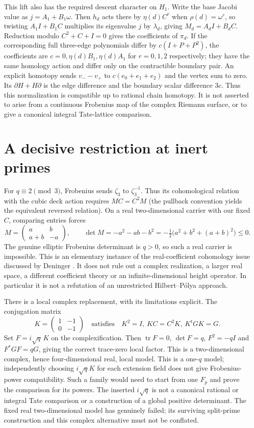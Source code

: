 \documentclass[11pt,oneside,openany]{book}
\theoremstyle{definition}\newtheorem{definition}[theorem]{Definition}
\theoremstyle{remark}\newtheorem{remark}[theorem]{Remark}
\DeclareMathOperator{\tr}{tr}\DeclareMathOperator{\Rea}{Re}
\begin{document}
This lift also has the required descent character on $H_1$. Write the base Jacobi value as $j=A_1+B_1\omega$. Then $h_d$ acts there by $\eta(d)C^r$ when $\rho(d)=\omega^r$, so twisting $A_1I+B_1C$ multiplies its eigenvalue $j$ by $\lambda_d$, giving $M_d=A_dI+B_dC$. Reduction modulo $C^2+C+I=0$ gives the coefficients of $\pi_d$. If the corresponding full three-edge polynomials differ by $c(I+P+P^2)$, the coefficients are $c=0,\eta(d)B_1,\eta(d)A_1$ for $r=0,1,2$ respectively; they have the same homology action and differ only on the contractible boundary pair. An explicit homotopy sends $v_--v_+$ to $c(e_0+e_1+e_2)$ and the vertex sum to zero. Its $\partial H+H\partial$ is the edge difference and the boundary scalar difference $3c$. Thus this normalization is compatible up to rational chain homotopy. It is not asserted to arise from a continuous Frobenius map of the complex Riemann surface, or to give a canonical integral Tate-lattice comparison.

\section{A decisive restriction at inert primes}
For $q\equiv2\pmod3$, Frobenius sends $\zeta_3$ to $\zeta_3^{-1}$. Thus its cohomological relation with the cubic deck action requires $MC=C^2M$ (the pullback convention yields the equivalent reversed relation). On a real two-dimensional carrier with our fixed $C$, comparing entries forces
\[
 M=\begin{pmatrix}a&b\\a+b&-a\end{pmatrix},\qquad
 \det M=-a^2-ab-b^2
 =-\tfrac12\bigl(a^2+b^2+(a+b)^2\bigr)\le0.
\]
The genuine elliptic Frobenius determinant is $q>0$, so such a real carrier is impossible. This is an elementary instance of the real-coefficient cohomology issue discussed by Deninger \cite{DeningerReal}. It does not rule out a complex realization, a larger real space, a different coefficient theory or an infinite-dimensional height operator. In particular it is not a refutation of an unrestricted Hilbert--P\'olya approach.

There is a local complex replacement, with its limitations explicit. The conjugation matrix
\[
 K=\begin{pmatrix}1&-1\\0&-1\end{pmatrix}
 \quad\text{satisfies}\quad K^2=I,\ KC=C^2K,\ K^tGK=G.
\]
Set $F=i\sqrt q\,K$ on the complexification. Then $\tr F=0$, $\det F=q$, $F^2=-qI$ and $F^*GF=qG$, giving the correct trace-zero local factor. This is a two-dimensional complex, hence four-dimensional real, local model. This is a one-$q$ model; independently choosing $i\sqrt q K$ for each extension field does not give Frobenius-power compatibility. Such a family would need to start from one $F_p$ and prove the comparison for its powers. The inserted $i\sqrt q$ is not a canonical rational or integral Tate comparison or a construction of a global positive determinant. The fixed real two-dimensional model has genuinely failed; its surviving split-prime construction and this complex alternative must not be conflated.
\end{document}
